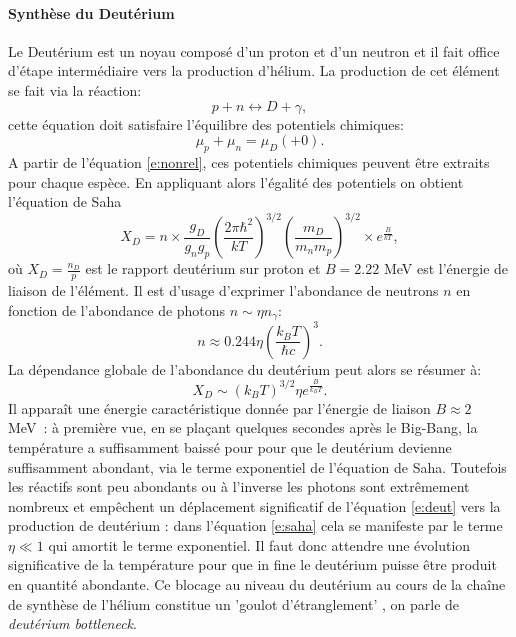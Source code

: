 \paragraph{Synthèse du Deutérium}
Le Deutérium est un noyau composé d'un proton et d'un neutron  et il fait office d'étape intermédiaire vers la production d'hélium. La production de cet élément se fait via la réaction:
\begin{equation}
p+n\leftrightarrow D+\gamma ,
\label{e:deut}
\end{equation}
cette équation doit satisfaire l'équilibre des potentiels chimiques:
\begin{equation}
\mu_p +\mu_n =\mu_D (+0).
\end{equation}
A partir de l'équation \ref{e:nonrel}, ces potentiels chimiques peuvent être extraits pour chaque espèce. En appliquant alors l'égalité des potentiels on obtient l'équation de Saha
\begin{equation}
X_D=n \times \frac{g_D}{g_n g_p} \left(\frac{2\pi \hbar^2}{kT}\right)^{3/2}\left(\frac{m_D}{m_n m_p}\right)^{3/2} \times e^{\frac{B}{kT}},
\end{equation}
où $X_D=\frac{n_D}{p}$ est le rapport deutérium sur proton et $B=2.22$ MeV est l'énergie de liaison de l'élément. Il est d'usage d'exprimer l'abondance de neutrons $n$ en fonction de l'abondance de photons $n\sim \eta n_\gamma$:
\begin{equation}
n\approx 0.244 \eta \left(\frac{k_BT}{\hbar c}\right)^3.
\end{equation}
La dépendance globale de l'abondance du deutérium peut alors se résumer à:
\begin{equation}
X_D\sim(k_BT)^{3/2}\eta e^{\frac{B}{k_B T}}.
\label{e:saha}
\end{equation}
Il apparaît une énergie caractéristique donnée par l'énergie de liaison $B\approx 2$ MeV~: à première vue, en se plaçant quelques secondes après le Big-Bang, la température a suffisamment baissé pour pour que le deutérium devienne suffisamment abondant, via le terme exponentiel de l'équation de Saha. Toutefois les réactifs sont peu abondants ou à l'inverse les photons sont extrêmement nombreux et empêchent un déplacement significatif de l'équation \ref{e:deut} vers la production de deutérium : dans l'équation \ref{e:saha} cela se manifeste par le terme $\eta \ll 1$ qui amortit le terme exponentiel. Il faut donc attendre une évolution significative de la température pour que in fine le deutérium puisse être produit en quantité abondante. Ce blocage au niveau du deutérium au cours de la chaîne de synthèse de l'hélium constitue un 'goulot d'étranglement' , on parle de \textit{deutérium bottleneck}.

